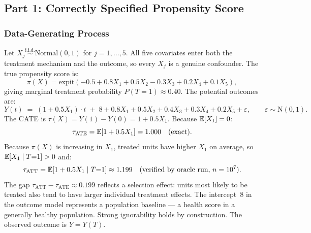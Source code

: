 \documentclass[master.tex]{subfiles}
\begin{document}
\subsection{Part 1: Correctly Specified Propensity Score}
\label{w6:sec:lab:part1}

\subsubsection*{Data-Generating Process}

\begin{tcolorbox}[defstyle, title={DGP for Lab~6}]
\label{w6:lab:dgp}
Let $X_j \overset{\mathrm{i.i.d.}}{\sim} \mathrm{Normal}(0,1)$ for
$j = 1, \ldots, 5$.  All five covariates enter both the treatment
mechanism and the outcome, so every $X_j$ is a genuine confounder.
The true propensity score is:
\begin{equation}
  \pi(X) = \mathrm{expit}(-0.5 + 0.8X_1 + 0.5X_2 - 0.3X_3 + 0.2X_4 + 0.1X_5),
  \label{w6:lab:ps}
\end{equation}
giving marginal treatment probability $P(T{=}1) \approx 0.40$.  The
potential outcomes are:
\begin{equation}
  Y(t) \;=\; (1 + 0.5X_1)\cdot t
          \;+\; 8 + 0.8X_1 + 0.5X_2 + 0.4X_3 + 0.3X_4 + 0.2X_5 + \varepsilon,
  \qquad \varepsilon \sim \mathrm{N}(0,1).
  \label{w6:lab:po}
\end{equation}
The CATE is $\tau(X) = Y(1) - Y(0) = 1 + 0.5X_1$.  Because $\mathbb{E}[X_1] = 0$:
\begin{equation}
  \tau_{\mathrm{ATE}} = \mathbb{E}[1 + 0.5X_1] = 1.000 \quad (\text{exact}).
  \label{w6:lab:ate}
\end{equation}
Because $\pi(X)$ is increasing in $X_1$, treated units have higher
$X_1$ on average, so $\mathbb{E}[X_1 \mid T{=}1] > 0$ and:
\begin{equation}
  \tau_{\mathrm{ATT}}
  = \mathbb{E}[1 + 0.5X_1 \mid T{=}1]
  \approx 1.199
  \quad (\text{verified by oracle run, } n = 10^7).
  \label{w6:lab:att}
\end{equation}
The gap $\tau_{\mathrm{ATT}} - \tau_{\mathrm{ATE}} \approx 0.199$
reflects a selection effect: units most likely to be treated also
tend to have larger individual treatment effects.  The intercept~$8$
in the outcome model represents a population baseline --- a health
score in a generally healthy population.  Strong ignorability holds
by construction.  The observed outcome is $Y = Y(T)$.
\end{tcolorbox}
\end{document}
